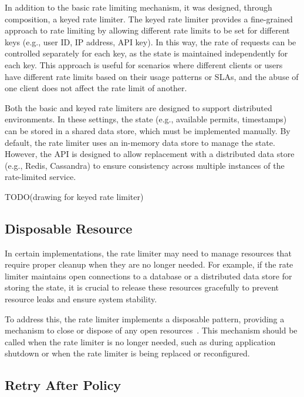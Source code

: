 In addition to the basic rate limiting mechanism, it was designed, through composition, a keyed rate limiter.
The keyed rate limiter provides a fine-grained approach to rate limiting
by allowing different rate limits to be set for different keys
(e.g., user ID, IP address, API key).
In this way, the rate of requests can be controlled separately for each key, as the state is maintained
independently for each key.
This approach is useful for scenarios
where different clients or users have different rate limits based on their usage patterns or SLAs,
and the abuse of one client does not affect the rate limit of another.

Both the basic and keyed rate limiters are designed to support distributed environments.
In these settings, the state (e.g., available permits, timestamps) can be stored in a shared data store,
which must be implemented manually.
By default, the rate limiter uses an in-memory data store to manage the state.
However,
the API is designed to allow replacement with a distributed data store
(e.g., Redis, Cassandra) to ensure consistency across multiple instances of the rate-limited service.

TODO(drawing for keyed rate limiter)

\subsection{Disposable Resource}\label{subsec:rate-limiter-disposable-resource}

In certain implementations, the rate limiter may need to manage resources that require proper cleanup when they are no longer needed.
For example, if the rate limiter maintains open connections to a database or a distributed data store
for storing the state, it is crucial to release these resources gracefully to prevent resource leaks and ensure system stability.

To address this, the rate limiter implements a disposable pattern,
providing a mechanism to close or dispose of any open resources~\cite{microsoft-dispose-pattern}. This mechanism should be called when the rate limiter is no longer needed, such as during application shutdown or when the rate limiter is being replaced or reconfigured.

\subsection{Retry After Policy}\label{subsec:rate-limiter-retry-after-policy}

